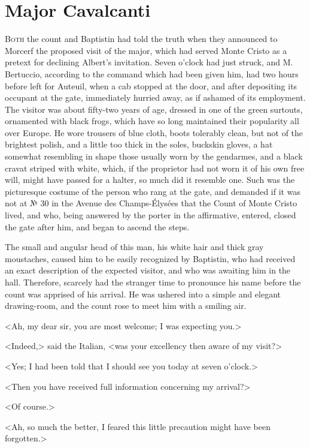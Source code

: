 \chapter{Major Cavalcanti} 

 \lettrine{B}{oth} the count and Baptistin had told the truth when they announced to Morcerf the proposed visit of the major, which had served Monte Cristo as a pretext for declining Albert's invitation. Seven o'clock had just struck, and M. Bertuccio, according to the command which had been given him, had two hours before left for Auteuil, when a cab stopped at the door, and after depositing its occupant at the gate, immediately hurried away, as if ashamed of its employment. The visitor was about fifty-two years of age, dressed in one of the green surtouts, ornamented with black frogs, which have so long maintained their popularity all over Europe. He wore trousers of blue cloth, boots tolerably clean, but not of the brightest polish, and a little too thick in the soles, buckskin gloves, a hat somewhat resembling in shape those usually worn by the gendarmes, and a black cravat striped with white, which, if the proprietor had not worn it of his own free will, might have passed for a halter, so much did it resemble one. Such was the picturesque costume of the person who rang at the gate, and demanded if it was not at № 30 in the Avenue des Champs-Élysées that the Count of Monte Cristo lived, and who, being answered by the porter in the affirmative, entered, closed the gate after him, and began to ascend the steps. 

 The small and angular head of this man, his white hair and thick gray moustaches, caused him to be easily recognized by Baptistin, who had received an exact description of the expected visitor, and who was awaiting him in the hall. Therefore, scarcely had the stranger time to pronounce his name before the count was apprised of his arrival. He was ushered into a simple and elegant drawing-room, and the count rose to meet him with a smiling air. 

 <Ah, my dear sir, you are most welcome; I was expecting you.> 

 <Indeed,> said the Italian, <was your excellency then aware of my visit?> 

 <Yes; I had been told that I should see you today at seven o'clock.> 

 <Then you have received full information concerning my arrival?> 

 <Of course.> 

 <Ah, so much the better, I feared this little precaution might have been forgotten.>

